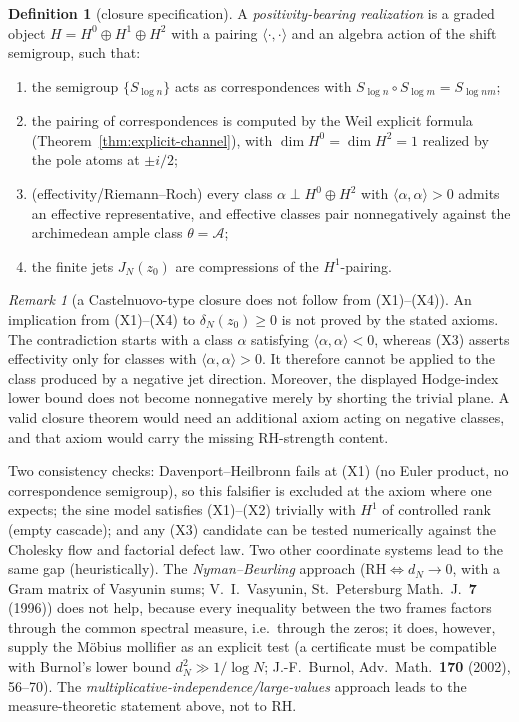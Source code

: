 \documentclass[11pt]{amsart}
\theoremstyle{definition}
\newtheorem{definition}[theorem]{Definition}
\theoremstyle{remark}
\newtheorem{remark}[theorem]{Remark}
\theoremstyle{definition}
\begin{document}
\begin{definition}[closure specification]\label{def:closure-spec}
A \emph{positivity-bearing realization} is a graded object $H=H^0\oplus H^1\oplus H^2$ with a pairing
$\langle\cdot,\cdot\rangle$ and an algebra action of the shift semigroup, such that:
\begin{enumerate}[label=\textnormal{(X\arabic*)}]
\item the semigroup $\{S_{\log n}\}$ acts as correspondences with
$S_{\log n}\circ S_{\log m}=S_{\log nm}$;
\item the pairing of correspondences is computed by the Weil explicit formula
(Theorem~\ref{thm:explicit-channel}), with $\dim H^0=\dim H^2=1$ realized by the pole atoms at
$\pm i/2$;
\item \textnormal{(effectivity/Riemann--Roch)} every class $\alpha\perp H^0\oplus H^2$ with
$\langle\alpha,\alpha\rangle>0$ admits an effective representative, and effective classes pair
nonnegatively against the archimedean ample class $\theta=\mathcal A$;
\item the finite jets $J_N(z_0)$ are compressions of the $H^1$-pairing.
\end{enumerate}
\end{definition}

\begin{remark}[a Castelnuovo-type closure does not follow from \textnormal{(X1)--(X4)}]\label{thm:conditional-closure}
An implication from \textnormal{(X1)--(X4)} to $\delta_N(z_0)\ge0$ is not proved by
the stated axioms.  The contradiction starts with a class $\alpha$ satisfying
$\langle\alpha,\alpha\rangle<0$, whereas \textnormal{(X3)} asserts effectivity only for classes with
$\langle\alpha,\alpha\rangle>0$.  It therefore cannot be applied to the class produced by a negative
jet direction.  Moreover, the displayed Hodge-index lower bound does not become nonnegative merely by
shorting the trivial plane.  A valid closure theorem would need an additional axiom acting on negative
classes, and that axiom would carry the missing RH-strength content.
\end{remark}

Two consistency checks: Davenport--Heilbronn fails at (X1) (no Euler
product, no correspondence semigroup), so this falsifier is excluded at the axiom where one expects;
the sine model satisfies (X1)--(X2) trivially with $H^1$ of controlled rank (empty cascade);
and any (X3) candidate can be tested numerically against the Cholesky flow and factorial defect
law.  Two other coordinate systems lead to the same gap (heuristically).  The \emph{Nyman--Beurling}
approach ($\mathrm{RH}\iff d_N\to0$, with a Gram matrix of Vasyunin sums; V.~I.~Vasyunin, St.\
Petersburg Math.\ J.\ \textbf{7} (1996)) does not help, because every inequality between the two frames
factors through the common spectral measure, i.e.\ through the zeros; it does, however, supply the
M\"obius mollifier as an explicit test (a certificate must be compatible with Burnol's lower bound
$d_N^2\gg 1/\log N$; J.-F.~Burnol, Adv.\ Math.\ \textbf{170} (2002), 56--70).  The
\emph{multiplicative-independence/large-values} approach leads to the measure-theoretic statement
above, not to RH.
\end{document}
